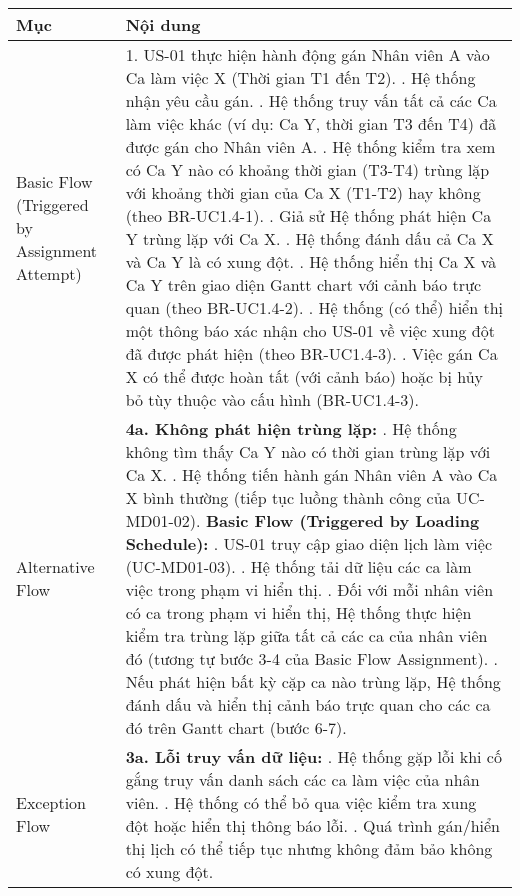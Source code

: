 \begin{longtable}{|m{4cm}|p{11cm}|}
\hline
\textbf{Mục} & \textbf{Nội dung} \\
\hline
Basic Flow (Triggered by Assignment Attempt) & 1. US-01 thực hiện hành động gán Nhân viên A vào Ca làm việc X (Thời gian T1 đến T2). \newline 2. Hệ thống nhận yêu cầu gán. \newline 3. Hệ thống truy vấn tất cả các Ca làm việc khác (ví dụ: Ca Y, thời gian T3 đến T4) đã được gán cho Nhân viên A. \newline 4. Hệ thống kiểm tra xem có Ca Y nào có khoảng thời gian (T3-T4) trùng lặp với khoảng thời gian của Ca X (T1-T2) hay không (theo BR-UC1.4-1). \newline 5. Giả sử Hệ thống phát hiện Ca Y trùng lặp với Ca X. \newline 6. Hệ thống đánh dấu cả Ca X và Ca Y là có xung đột. \newline 7. Hệ thống hiển thị Ca X và Ca Y trên giao diện Gantt chart với cảnh báo trực quan (theo BR-UC1.4-2). \newline 8. Hệ thống (có thể) hiển thị một thông báo xác nhận cho US-01 về việc xung đột đã được phát hiện (theo BR-UC1.4-3). \newline 9. Việc gán Ca X có thể được hoàn tất (với cảnh báo) hoặc bị hủy bỏ tùy thuộc vào cấu hình (BR-UC1.4-3). \\
\hline
Alternative Flow & \textbf{4a. Không phát hiện trùng lặp:} \newline    1. Hệ thống không tìm thấy Ca Y nào có thời gian trùng lặp với Ca X. \newline    2. Hệ thống tiến hành gán Nhân viên A vào Ca X bình thường (tiếp tục luồng thành công của UC-MD01-02). \newline \textbf{Basic Flow (Triggered by Loading Schedule):} \newline    1. US-01 truy cập giao diện lịch làm việc (UC-MD01-03). \newline    2. Hệ thống tải dữ liệu các ca làm việc trong phạm vi hiển thị. \newline    3. Đối với mỗi nhân viên có ca trong phạm vi hiển thị, Hệ thống thực hiện kiểm tra trùng lặp giữa tất cả các ca của nhân viên đó (tương tự bước 3-4 của Basic Flow Assignment). \newline    4. Nếu phát hiện bất kỳ cặp ca nào trùng lặp, Hệ thống đánh dấu và hiển thị cảnh báo trực quan cho các ca đó trên Gantt chart (bước 6-7). \\
\hline
Exception Flow & \textbf{3a. Lỗi truy vấn dữ liệu:} \newline    1. Hệ thống gặp lỗi khi cố gắng truy vấn danh sách các ca làm việc của nhân viên. \newline    2. Hệ thống có thể bỏ qua việc kiểm tra xung đột hoặc hiển thị thông báo lỗi. \newline    3. Quá trình gán/hiển thị lịch có thể tiếp tục nhưng không đảm bảo không có xung đột. \\

\end{longtable}
